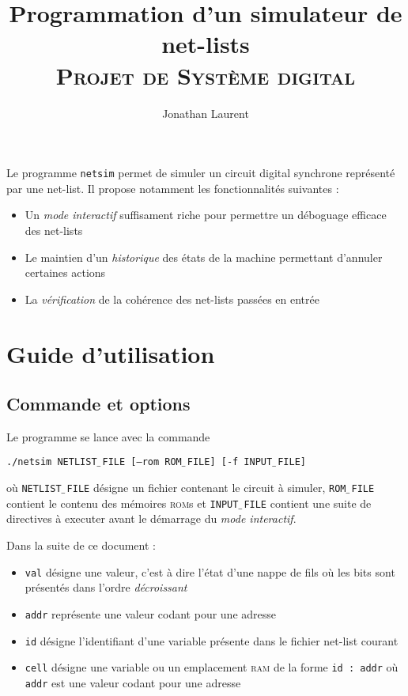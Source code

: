 \documentclass[11pt, a4paper]{article}
\newcommand{\prog}[1]{{\tt#1}}
\newcommand{\underscore}{$\_\,$}
\begin{document}
\title{Programmation d'un simulateur de net-lists \\ \normalsize{\textsc{Projet de Système digital}}}
\author{Jonathan Laurent}
\maketitle


Le programme \prog{netsim} permet de simuler un circuit digital synchrone représenté par une net-list. Il propose notamment les fonctionnalités suivantes :

\begin{itemize}
\item Un \textit{mode interactif} suffisament riche pour permettre un déboguage efficace des net-lists
\item Le maintien d'un \textit{historique} des états de la machine permettant d'annuler certaines actions
\item La \textit{vérification} de la cohérence des net-lists passées en entrée
\end{itemize}

\section{Guide d'utilisation}
\subsection{Commande et options}

Le programme se lance avec la commande 

\begin{center}\prog{./netsim NETLIST\underscore{}FILE [--rom ROM\underscore{}FILE] [-f INPUT\underscore{}FILE] }\end{center}

où \prog{NETLIST\underscore{}FILE} désigne un fichier contenant le circuit à simuler, \prog{ROM\underscore{}FILE} contient le contenu des mémoires \textsc{rom}s et \prog{INPUT\underscore{}FILE} contient une suite de directives à executer avant le démarrage du \textit{mode interactif}.

\medskip

Dans la suite de ce document :
\begin{itemize}
\item \prog{val} désigne une valeur, c'est à dire l'état d'une nappe de fils où les bits sont présentés dans l'ordre \emph{décroissant}
\item \prog{addr} représente une valeur codant pour une adresse
\item \prog{id} désigne l'identifiant d'une variable présente dans le fichier net-list courant
\item \prog{cell} désigne une variable ou un emplacement \textsc{ram} de la forme \prog{id : addr} où \prog{addr} est une valeur codant pour une adresse

\end{itemize}
\end{document}
